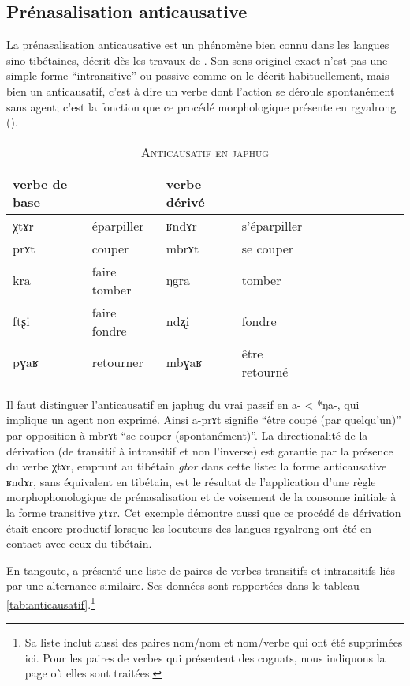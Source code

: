 \documentclass[oldfontcommands,twoside,a4paper,11pt,draft]{memoir}
\newcommand{\ipa}[1]{{\phon #1}} %
\newcommand{\captionb}[1]{\caption{\textsc{#1}}}
\begin{document}
\subsection{Prénasalisation anticausative} \label{subsec:anticausatif}
La prénasalisation anticausative est un phénomène bien connu dans les langues sino-tibétaines, décrit dès les travaux de \citet{conrady1896}. Son sens originel exact n'est pas une simple forme ``intransitive'' ou passive comme on le décrit habituellement, mais bien un anticausatif, c'est à dire un verbe dont l'action se déroule spontanément sans agent; c'est la fonction que ce procédé morphologique présente en rgyalrong (\citealt{jacques12demotion}).


\begin{table}
\captionb{Anticausatif en japhug}\label{tab:anticausatif.japhug}
\begin{tabular} {lllllllllll}
\toprule
verbe de base & & verbe dérivé &&\\
\midrule
 \ipa{χtɤr} & éparpiller    &  \ipa{ʁndɤr} & s'éparpiller    & \\
 \ipa{prɤt} & couper    &  \ipa{mbrɤt} & se couper    & \\
  \ipa{kra} & faire tomber    &  \ipa{ŋgra} & tomber   & \\
    \ipa{ftʂi} & faire fondre    &  \ipa{ndʐi} & fondre   & \\
 \ipa{pɣaʁ} & retourner    &  \ipa{mbɣaʁ} &   être retourné   & \\
 \bottomrule
 \end{tabular}
\end{table}
Il faut distinguer l'anticausatif en japhug du vrai passif en \ipa{a-} < *ŋa-, qui implique un agent non exprimé. Ainsi \ipa{a-prɤt} signifie ``être coupé (par quelqu'un)'' par opposition à \ipa{mbrɤt} ``se couper (spontanément)''. La directionalité de la dérivation (de transitif à intransitif et non l'inverse) est garantie par la présence du verbe \ipa{χtɤr}, emprunt au tibétain \textit{gtor} dans cette liste: la forme anticausative  \ipa{ʁndɤr}, sans équivalent en tibétain, est le résultat de l'application d'une règle morphophonologique de prénasalisation et de voisement de la consonne initiale à la forme transitive \ipa{χtɤr}. Cet exemple démontre aussi que ce procédé de dérivation était encore productif lorsque les locuteurs des langues rgyalrong ont été en contact avec ceux du tibétain.




En tangoute, \citet{gong88alternations} a présenté une liste de paires de verbes transitifs et intransitifs liés par une alternance similaire. Ses données sont rapportées dans le tableau \ref{tab:anticausatif}.\footnote{Sa liste inclut aussi des paires nom/nom et nom/verbe qui ont été supprimées ici. Pour les paires de verbes qui présentent des cognats, nous indiquons la page où elles sont traitées.}
\end{document}
